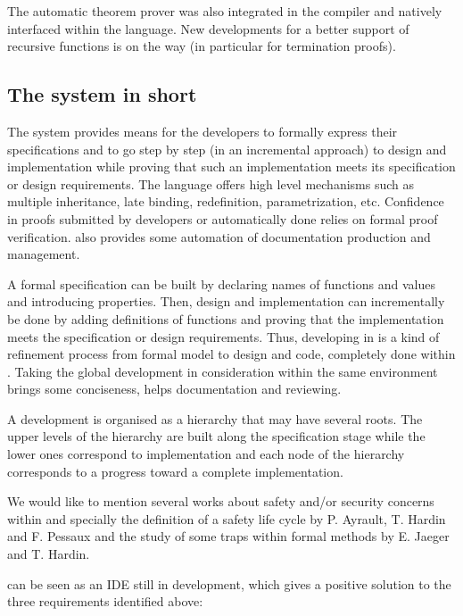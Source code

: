 The {\zenon} automatic theorem prover was also integrated in the
compiler and natively interfaced within the {\focal} language. New
developments for a better support of recursive functions is on the way (in particular for
termination proofs).



\subsection*{The {\focal} system in short}

The {\focal} system provides means for the developers to formally express
their specifications and to go step by step (in an incremental approach) to
design and implementation while proving that such an implementation
meets its specification or design requirements. The {\focal} language offers
high level mechanisms such as multiple inheritance, late binding, redefinition,
parametrization, etc.  Confidence in proofs submitted by developers or
automatically done relies on formal proof verification. {\focal} also
provides some automation of documentation production and management.

A formal specification can be built by declaring names of functions
and values and introducing
properties. Then, design and implementation can incrementally be done
by adding definitions of functions and proving that the implementation
meets the specification or design requirements. Thus, developing in
{\focal} is a kind of refinement process from  formal model to design
and code, completely done within {\focal}. Taking the global development
in consideration within the same environment brings some conciseness,
helps documentation and reviewing.

A {\focal} development is organised as a hierarchy that may have
several roots. The upper levels of the hierarchy are built along the
specification stage while the lower ones correspond to
implementation and each  node of the hierarchy corresponds to a progress
toward a complete implementation.

We would like to mention several works about safety and/or security
concerns within {\focal} and specially the definition of a safety life
cycle by P. Ayrault, T. Hardin and F. Pessaux \cite{TTSS08} and the
study of some traps within formal methods by E. Jaeger and
T. Hardin\cite{traps}.

{\focal} can be seen as an IDE still in development, which
gives a positive solution to the three requirements identified above:

